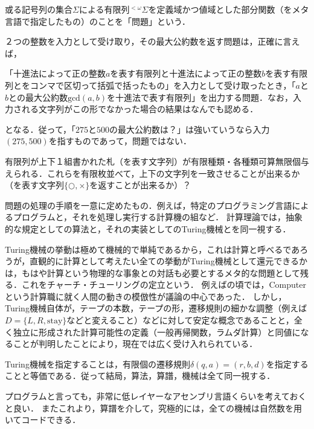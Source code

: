 \documentclass[uplatex, dvipdfmx]{jsreport}
\begin{document}
\begin{definition}[問題]
    或る記号列の集合$\Sigma$による有限列${}^{<\omega}\Sigma$を定義域かつ値域とした部分関数（をメタ言語で指定したもの）のことを「問題」という．
\end{definition}
\begin{example}
    ２つの整数を入力として受け取り，その最大公約数を返す問題は，正確に言えば，
    \begin{center}
        「十進法によって正の整数$a$を表す有限列と十進法によって正の整数$b$を表す有限列とをコンマで区切って括弧で括ったもの」を入力として受け取ったとき，「$a$と$b$との最大公約数$\mathrm{gcd}(a,b)$を十進法で表す有限列」を出力する問題．なお，入力される文字列がこの形でなかった場合の結果はなんでも認める．
    \end{center}
    となる．従って，「$275$と$500$の最大公約数は？」は強いていうなら入力$(275,500)$を指すものであって，問題ではない．
\end{example}
\begin{example}\label{problem-PCP}
    有限列が上下１組書かれた札（を表す文字列）が有限種類・各種類可算無限個与えられる．これらを有限枚並べて，上下の文字列を一致させることが出来るか（を表す文字列$\{\bigcirc,\times\}$を返すことが出来るか）？
\end{example}

\begin{definition}[算法]
    問題の処理の手順を一意に定めたもの．例えば，特定のプログラミング言語によるプログラムと，それを処理し実行する計算機の組など．
    計算理論では，抽象的な規定としての算法と，それの実装としてのTuring機械とを同一視する．
\end{definition}
\begin{remark}
    Turing機械の挙動は極めて機械的で単純であるから，これは計算と呼べるであろうが，直観的に計算として考えたい全ての挙動がTuring機械として還元できるかは，もはや計算という物理的な事象との対話も必要とするメタ的な問題として残る．これをチャーチ・チューリングの定立という．
    例えば\cite{Turing-OnComputableNumbers}の頃では，Computerという計算職に就く人間の動きの模倣性が議論の中心であった．
    しかし，Turing機械自体が，テープの本数，テープの形，遷移規則の細かな調整（例えば$D=\{L,R,\mathrm{stay}\}$などと変えること）などに対して安定な概念であることと，全く独立に形成された計算可能性の定義（一般再帰関数，ラムダ計算）と同値になることが判明したことにより，現在では広く受け入れられている．
\end{remark}
\begin{definition}[算譜]
    Turing機械を指定することは，有限個の遷移規則$\delta(q,a)=(r,b,d)$を指定することと等価である．従って結局，算法，算譜，機械は全て同一視する．
\end{definition}
\begin{remark}
    プログラムと言っても，非常に低レイヤーなアセンブリ言語くらいを考えておくと良い．
    またこれより，算譜を介して，究極的には，全ての機械は自然数を用いてコードできる．
\end{remark}
\end{document}
